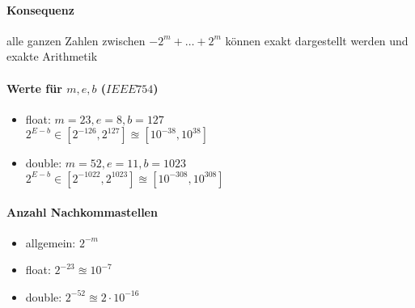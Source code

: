 \documentclass{article}
\begin{document}
	\paragraph{Konsequenz}
	alle ganzen Zahlen zwischen $-2^m + \dots + 2^m $ können exakt dargestellt werden und exakte Arithmetik

	\paragraph{Werte für $m,e,b$ ($IEEE 754$)}
	\begin{itemize}
		\item float: $m=23, e=8, b=127$ \\
		$2^{E-b} \in [2^{-126}, 2^{127}] \approxeq [10^{-38}, 10^{38}] $
		\item double: $m=52, e=11, b=1023$ \\
		$2^{E-b} \in [2^{-1022}, 2^{1023}] \approxeq [10^{-308}, 10^{308}] $
	\end{itemize}

	\paragraph{Anzahl Nachkommastellen}
	\begin{itemize}
		\item allgemein: $2^{-m} $
		\item float: $2^{-23} \approxeq 10^{-7} $
		\item double: $2^{-52} \approxeq 2 \cdot 10^{-16} $
	\end{itemize}
\end{document}
